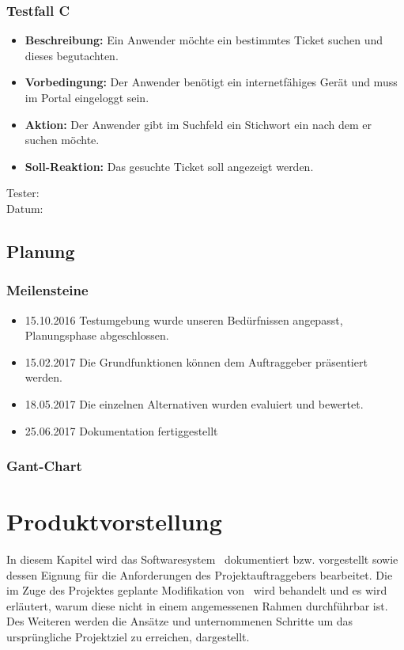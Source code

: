 \subsection{Testfall C}
\begin{itemize}
	\item \textbf{Beschreibung:} Ein Anwender möchte ein bestimmtes Ticket suchen und dieses begutachten. 
	\item \textbf{Vorbedingung:} Der Anwender benötigt ein internetfähiges Gerät und muss im Portal eingeloggt sein.
	\item \textbf{Aktion:} Der Anwender gibt im Suchfeld ein Stichwort ein nach dem er suchen möchte. 
	\item \textbf{Soll-Reaktion:} Das gesuchte Ticket soll angezeigt werden.
\end{itemize}
Tester:
\\
Datum:




\section{Planung}
\subsection{Meilensteine}
\begin{itemize}
	\item 15.10.2016 Testumgebung wurde unseren Bedürfnissen angepasst, Planungsphase abgeschlossen.
	\item 15.02.2017 Die Grundfunktionen können dem Auftraggeber präsentiert werden.
	\item 18.05.2017 Die einzelnen Alternativen wurden evaluiert und bewertet.
	\item 25.06.2017 Dokumentation fertiggestellt
\end{itemize}


\subsection{Gant-Chart}

\chapter{Produktvorstellung}
In diesem Kapitel wird das Softwaresystem \getOst\ dokumentiert bzw. vorgestellt sowie dessen Eignung für die Anforderungen des Projektauftraggebers bearbeitet. Die im Zuge des Projektes geplante Modifikation von \getOst\ wird behandelt und es wird erläutert, warum diese nicht in einem angemessenen Rahmen durchführbar ist. Des Weiteren werden die Ansätze und unternommenen Schritte um das ursprüngliche Projektziel zu erreichen, dargestellt.

